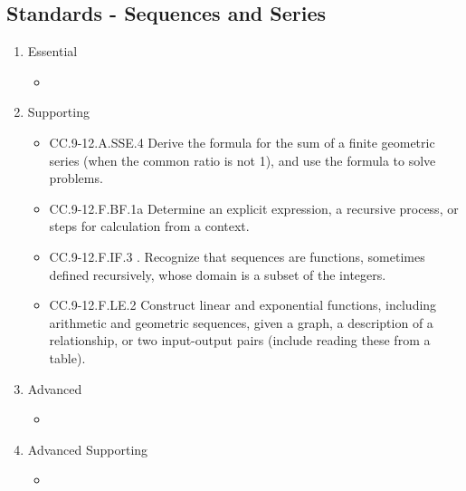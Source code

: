 \documentclass{article}
\begin{document}
\subsection*{Standards - Sequences and Series}
\begin{enumerate}
	\item Essential
	\begin{itemize}
		\item
	\end{itemize}		
	\item Supporting
	\begin{itemize}
		\item CC.9-12.A.SSE.4  Derive the formula for the sum of a finite geometric series (when the common ratio is not 1), and use the formula to solve problems. 
		\item CC.9-12.F.BF.1a Determine an explicit expression, a recursive process, or steps for calculation from a context.
		\item CC.9-12.F.IF.3 . Recognize that sequences are functions, sometimes defined recursively, whose domain is a subset of the integers. 
		\item CC.9-12.F.LE.2  Construct linear and exponential functions, including arithmetic and geometric sequences, given a graph, a description of a relationship, or two input-output pairs (include reading these from a table).
	\end{itemize}
	\item Advanced
	\begin{itemize}
		\item
	\end{itemize}
	\item Advanced Supporting
	\begin{itemize}
		\item
	\end{itemize}
\end{enumerate}
\newpage
\end{document}

